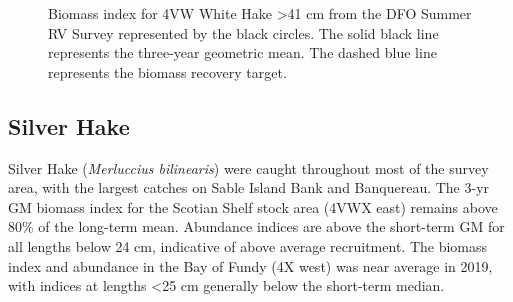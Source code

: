 \documentclass[11pt]{book}
\begin{document}
\begin{figure}[htb]

{\centering {} 

}

\caption{Biomass index for 4VW White Hake \textgreater41 cm from the DFO Summer RV Survey represented by the black circles. The solid black line represents the three-year geometric mean. The dashed blue line represents the biomass recovery target.}\label{fig:25-fig-whitehake-biomass4VW-41cm}
\end{figure}
\clearpage

\hypertarget{silver-hake}{%
\subsection{Silver Hake}\label{silver-hake}}

Silver Hake (\emph{Merluccius bilinearis}) were caught throughout most of the survey area, with the largest catches on Sable Island Bank and Banquereau. The 3-yr GM biomass index for the Scotian Shelf stock area (4VWX east) remains above 80\% of the long-term mean. Abundance indices are above the short-term GM for all lengths below 24 cm, indicative of above average recruitment. The biomass index and abundance in the Bay of Fundy (4X west) was near average in 2019, with indices at lengths \textless25 cm generally below the short-term median.
\end{document}
